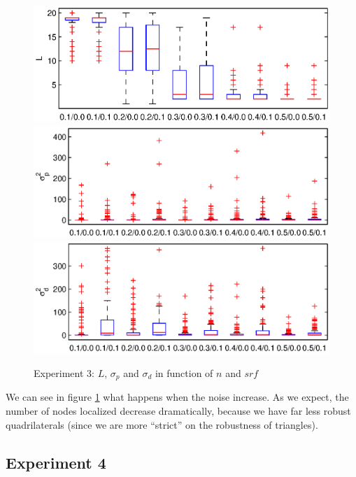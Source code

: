 \documentclass[letterpaper, 10 pt, conference]{ieeeconf}  %
\begin{document}
\begin{figure}[ht!]
\centering
\includegraphics[width=1\columnwidth]{set3-L.eps}
\includegraphics[width=1\columnwidth]{set3-sp.eps}
\includegraphics[width=1\columnwidth]{set3-sd.eps}
\caption{\label{figure:set3}Experiment 3: $L$, $\sigma_p$ and $\sigma_d$ in function of $n$ and $srf$}
\end{figure}

We can see in figure \ref{figure:set3} what happens when the noise increase. As we expect, the number of nodes localized decrease dramatically, because we have far less robust quadrilaterals (since we are more ``strict'' on the robustness of triangles). 

\subsection{Experiment 4}
\end{document}
